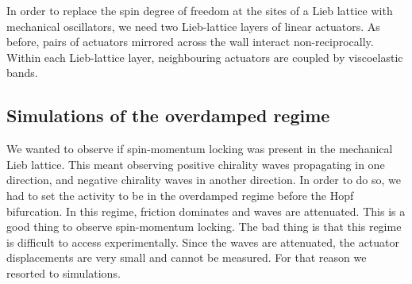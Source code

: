 \documentclass[11pt, a4paper]{article} %
\begin{document}
In order to replace the spin degree of freedom at the sites of a Lieb lattice with mechanical oscillators, 
we need two Lieb-lattice layers of linear actuators. 
As before, pairs of actuators mirrored across the wall interact non-reciprocally. Within each Lieb-lattice layer,
neighbouring actuators are coupled by viscoelastic bands. 

\subsection{Simulations of the overdamped regime}

We wanted to observe if spin-momentum locking was present in the mechanical Lieb lattice. 
This meant observing positive chirality waves propagating in one direction, and negative chirality waves 
in another direction. In order to do so, we had to set the activity to be in the overdamped regime before the 
Hopf bifurcation. In this regime, friction dominates and waves are attenuated. This is a good thing to observe 
spin-momentum locking. The bad thing is that this regime is difficult to access experimentally. Since the waves are attenuated, 
the actuator displacements are very small and cannot be measured. For that reason we resorted to simulations. 
\end{document}
